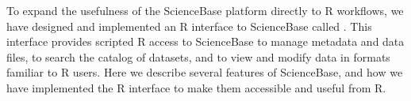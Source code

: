 To expand the usefulness of the ScienceBase platform directly to R workflows, 
we have designed and
implemented an R interface to ScienceBase called .
This interface provides scripted R access to ScienceBase to manage metadata and
data files, to search the catalog of datasets, and to view and modify data in
formats familiar to R users.
Here we describe several features of ScienceBase, and how we have
implemented the R interface to make them accessible and useful from R.
